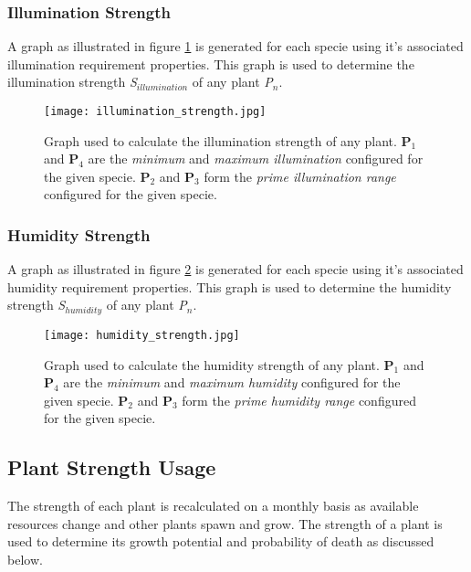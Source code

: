 \subsubsection{Illumination Strength}

A graph as illustrated in figure \ref{fig:illumination_strength} is generated for each specie using it's associated illumination requirement properties. This graph is used to determine the illumination strength \textit{S$_{illumination}$} of any plant \textit{P$_{n}$}.

\begin{figure}
\center
	\texttt{[image: illumination\_strength.jpg]}
	\caption{ Graph used to calculate the illumination strength of any plant. \textbf{P$_{1}$} and \textbf{P$_{4}$} are the \textit{minimum} and \textit{maximum illumination} configured for the given specie. \textbf{P$_{2}$} and \textbf{P$_{3}$} form the \textit{prime illumination range} configured for the given specie.  }	
	\label{fig:illumination_strength}
\end{figure}
	
\subsubsection{Humidity Strength}

A graph as illustrated in figure \ref{fig:humidity_strength} is generated for each specie using it's associated humidity requirement properties. This graph is used to determine the humidity strength \textit{S$_{humidity}$} of any plant \textit{P$_{n}$}.

\begin{figure}
\center
	\texttt{[image: humidity\_strength.jpg]}
	\caption{ Graph used to calculate the humidity strength of any plant. \textbf{P$_{1}$} and \textbf{P$_{4}$} are the \textit{minimum} and \textit{maximum humidity} configured for the given specie. \textbf{P$_{2}$} and \textbf{P$_{3}$} form the \textit{prime humidity range} configured for the given specie.  }	
	\label{fig:humidity_strength}
\end{figure}


\subsection{Plant Strength Usage}

The strength of each plant is recalculated on a monthly basis as available resources change and other plants spawn and grow. The strength of a plant is used to determine its growth potential and probability of death as discussed below.

